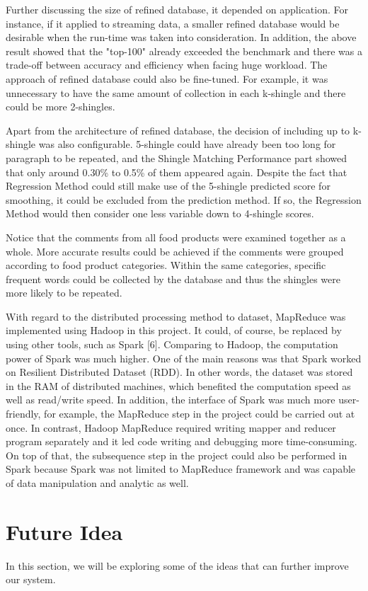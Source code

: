 Further discussing the size of refined database, it depended on application. For instance, if it applied to streaming data, a smaller refined database would be desirable when the run-time was taken into consideration. In addition, the above result showed that the "top-100" already exceeded the benchmark and there was a trade-off between accuracy and efficiency when facing huge workload. The approach of refined database could also be fine-tuned. For example, it was unnecessary to have the same amount of collection in each k-shingle and there could be more 2-shingles. 

Apart from the architecture of refined database, the decision of including up to k-shingle was also configurable. 5-shingle could have already been too long for paragraph to be repeated, and the Shingle Matching Performance part showed that only around 0.30\% to 0.5\% of them appeared again. Despite the fact that Regression Method could still make use of the 5-shingle predicted score for smoothing, it could be excluded from the prediction method. If so, the Regression Method would then consider one less variable down to 4-shingle scores.

Notice that the comments from all food products were examined together as a whole. More accurate results could be achieved if the comments were grouped according to food product categories. Within the same categories, specific frequent words could be collected by the database and thus the shingles were more likely to be repeated.

With regard to the distributed processing method to dataset, MapReduce was implemented using Hadoop in this project. It could, of course, be replaced by using other tools, such as Spark [6]. Comparing to Hadoop, the computation power of Spark was much higher. One of the main reasons was that Spark worked on Resilient Distributed Dataset (RDD). In other words, the dataset was stored in the RAM of distributed machines, which benefited the computation speed as well as read/write speed. In addition, the interface of Spark was much more user-friendly, for example, the MapReduce step in the project could be carried out at once. In contrast, Hadoop MapReduce required writing mapper and reducer program separately and it led code writing and debugging more time-consuming. On top of that, the subsequence step in the project could also be performed in Spark because Spark was not limited to MapReduce framework and was capable of data manipulation and analytic as well. 


\section{Future Idea}
In this section, we will be exploring some of the ideas that can further improve our system.
